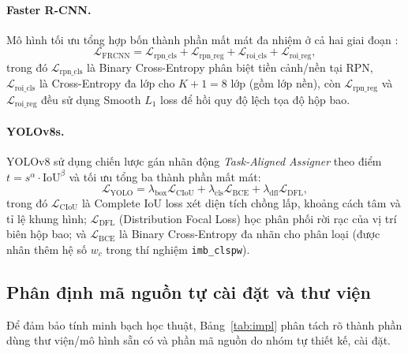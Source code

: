 \documentclass[11pt]{article}
\begin{document}
\paragraph{Faster R-CNN.}
Mô hình tối ưu tổng hợp bốn thành phần mất mát đa nhiệm ở cả hai giai đoạn \citep{ren2015faster}:
\begin{equation}
\mathcal{L}_{\text{FRCNN}} = \mathcal{L}_{\text{rpn\_cls}} + \mathcal{L}_{\text{rpn\_reg}} + \mathcal{L}_{\text{roi\_cls}} + \mathcal{L}_{\text{roi\_reg}},
\end{equation}
trong đó $\mathcal{L}_{\text{rpn\_cls}}$ là Binary Cross-Entropy phân biệt tiền cảnh/nền tại RPN, $\mathcal{L}_{\text{roi\_cls}}$ là Cross-Entropy đa lớp cho $K+1=8$ lớp (gồm lớp nền), còn $\mathcal{L}_{\text{rpn\_reg}}$ và $\mathcal{L}_{\text{roi\_reg}}$ đều sử dụng Smooth $L_1$ loss để hồi quy độ lệch tọa độ hộp bao.

\paragraph{YOLOv8s.}
YOLOv8 sử dụng chiến lược gán nhãn động \textit{Task-Aligned Assigner} theo điểm $t = s^\alpha \cdot \text{IoU}^\beta$ và tối ưu tổng ba thành phần mất mát:
\begin{equation}
\mathcal{L}_{\text{YOLO}} = \lambda_{\text{box}}\mathcal{L}_{\text{CIoU}} + \lambda_{\text{cls}}\mathcal{L}_{\text{BCE}} + \lambda_{\text{dfl}}\mathcal{L}_{\text{DFL}},
\end{equation}
trong đó $\mathcal{L}_{\text{CIoU}}$ là Complete IoU loss xét diện tích chồng lấp, khoảng cách tâm và tỉ lệ khung hình; $\mathcal{L}_{\text{DFL}}$ (Distribution Focal Loss) học phân phối rời rạc của vị trí biên hộp bao; và $\mathcal{L}_{\text{BCE}}$ là Binary Cross-Entropy đa nhãn cho phân loại (được nhân thêm hệ số $w_c$ trong thí nghiệm \texttt{imb\_clspw}).

\subsection{Phân định mã nguồn tự cài đặt và thư viện}

Để đảm bảo tính minh bạch học thuật, Bảng~\ref{tab:impl} phân tách rõ thành phần dùng thư viện/mô hình sẵn có và phần mã nguồn do nhóm tự thiết kế, cài đặt.
\end{document}
